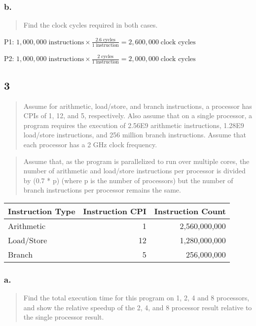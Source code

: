 \documentclass[]{article}
\begin{document}
\subsubsection{b.}\label{header-n4862}

\begin{quote}
Find the clock cycles required in both cases.
\end{quote}

P1:
\(1,000,000 \;\text{instructions} \times \frac{2.6 \;\text{cycles}}{1 \;\text{instruction}} = 2,600,000 \;\text{clock cycles}\)

P2:
\(1,000,000 \;\text{instructions} \times \frac{2 \;\text{cycles}}{1 \;\text{instruction}} = 2,000,000 \;\text{clock cycles}\)

\subsection{3}\label{header-n4870}

\begin{quote}
Assume for arithmetic, load/store, and branch instructions, a processor
has CPIs of 1, 12, and 5, respectively. Also assume that on a single
processor, a program requires the execution of 2.56E9 arithmetic
instructions, 1.28E9 load/store instructions, and 256 million branch
instructions. Assume that each processor has a 2 GHz clock frequency.
\end{quote}

\begin{quote}
Assume that, as the program is parallelized to run over multiple cores,
the number of arithmetic and load/store instructions per processor is
divided by (0.7 * p) (where p is the number of processors) but the
number of branch instructions per processor remains the same.
\end{quote}

\begin{longtable}[]{@{}lrr@{}}
\toprule
Instruction Type & Instruction CPI & Instruction Count\tabularnewline
\midrule
\endhead
Arithmetic & 1 & 2,560,000,000\tabularnewline
Load/Store & 12 & 1,280,000,000\tabularnewline
Branch & 5 & 256,000,000\tabularnewline
\bottomrule
\end{longtable}

\subsubsection{a.}\label{header-n4898}

\begin{quote}
Find the total execution time for this program on 1, 2, 4 and 8
processors, and show the relative speedup of the 2, 4, and 8 processor
result relative to the single processor result.
\end{quote}
\end{document}
